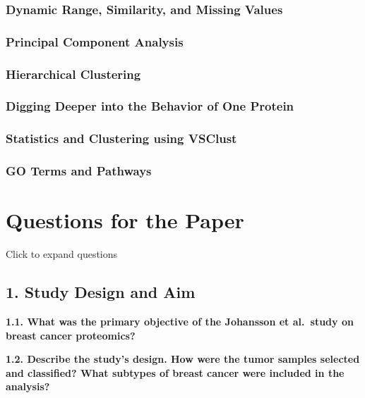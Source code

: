 \documentclass[
  letterpaper,
  DIV=11,
  numbers=noendperiod]{scrartcl}
\begin{document}
\subsubsection{Dynamic Range, Similarity, and Missing
Values}\label{dynamic-range-similarity-and-missing-values}

\subsubsection{Principal Component
Analysis}\label{principal-component-analysis}

\subsubsection{Hierarchical Clustering}\label{hierarchical-clustering}

\subsubsection{Digging Deeper into the Behavior of One
Protein}\label{digging-deeper-into-the-behavior-of-one-protein}

\subsubsection{Statistics and Clustering using
VSClust}\label{statistics-and-clustering-using-vsclust}

\subsubsection{GO Terms and Pathways}\label{go-terms-and-pathways}

\section{Questions for the Paper}\label{questions-for-the-paper}

Click to expand questions

\subsection{1. Study Design and Aim}\label{study-design-and-aim}

\textbf{1.1. What was the primary objective of the Johansson et
al.~study on breast cancer proteomics?}

\textbf{1.2. Describe the study's design. How were the tumor samples
selected and classified? What subtypes of breast cancer were included in
the analysis?}
\end{document}
